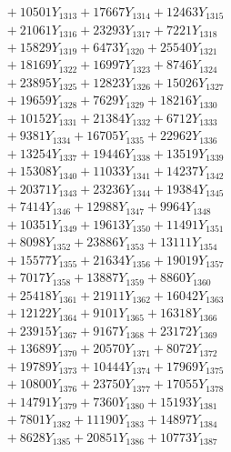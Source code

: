 \documentclass[a4paper,10pt]{article}
\begin{document}
{\begin{align}
&\;  + 10501 Y_{1313} + 17667 Y_{1314} + 12463 Y_{1315} \\[0.3ex]
&\;  + 21061 Y_{1316} + 23293 Y_{1317} + 7221 Y_{1318} \\[0.5ex]\allowbreak
&\;  + 15829 Y_{1319} + 6473 Y_{1320} + 25540 Y_{1321} \\[0.3ex]
&\;  + 18169 Y_{1322} + 16997 Y_{1323} + 8746 Y_{1324} \\[0.3ex]
&\;  + 23895 Y_{1325} + 12823 Y_{1326} + 15026 Y_{1327} \\[0.3ex]
&\;  + 19659 Y_{1328} + 7629 Y_{1329} + 18216 Y_{1330} \\[0.3ex]
&\;  + 10152 Y_{1331} + 21384 Y_{1332} + 6712 Y_{1333} \\[0.3ex]
&\;  + 9381 Y_{1334} + 16705 Y_{1335} + 22962 Y_{1336} \\[0.3ex]
&\;  + 13254 Y_{1337} + 19446 Y_{1338} + 13519 Y_{1339} \\[0.3ex]
&\;  + 15308 Y_{1340} + 11033 Y_{1341} + 14237 Y_{1342} \\[0.3ex]
&\;  + 20371 Y_{1343} + 23236 Y_{1344} + 19384 Y_{1345} \\[0.3ex]
&\;  + 7414 Y_{1346} + 12988 Y_{1347} + 9964 Y_{1348} \\[0.5ex]\allowbreak
&\;  + 10351 Y_{1349} + 19613 Y_{1350} + 11491 Y_{1351} \\[0.3ex]
&\;  + 8098 Y_{1352} + 23886 Y_{1353} + 13111 Y_{1354} \\[0.3ex]
&\;  + 15577 Y_{1355} + 21634 Y_{1356} + 19019 Y_{1357} \\[0.3ex]
&\;  + 7017 Y_{1358} + 13887 Y_{1359} + 8860 Y_{1360} \\[0.3ex]
&\;  + 25418 Y_{1361} + 21911 Y_{1362} + 16042 Y_{1363} \\[0.3ex]
&\;  + 12122 Y_{1364} + 9101 Y_{1365} + 16318 Y_{1366} \\[0.3ex]
&\;  + 23915 Y_{1367} + 9167 Y_{1368} + 23172 Y_{1369} \\[0.3ex]
&\;  + 13689 Y_{1370} + 20570 Y_{1371} + 8072 Y_{1372} \\[0.3ex]
&\;  + 19789 Y_{1373} + 10444 Y_{1374} + 17969 Y_{1375} \\[0.3ex]
&\;  + 10800 Y_{1376} + 23750 Y_{1377} + 17055 Y_{1378} \\[0.5ex]\allowbreak
&\;  + 14791 Y_{1379} + 7360 Y_{1380} + 15193 Y_{1381} \\[0.3ex]
&\;  + 7801 Y_{1382} + 11190 Y_{1383} + 14897 Y_{1384} \\[0.3ex]
&\;  + 8628 Y_{1385} + 20851 Y_{1386} + 10773 Y_{1387} \\[0.3ex]

\end{align}}
\end{document}
